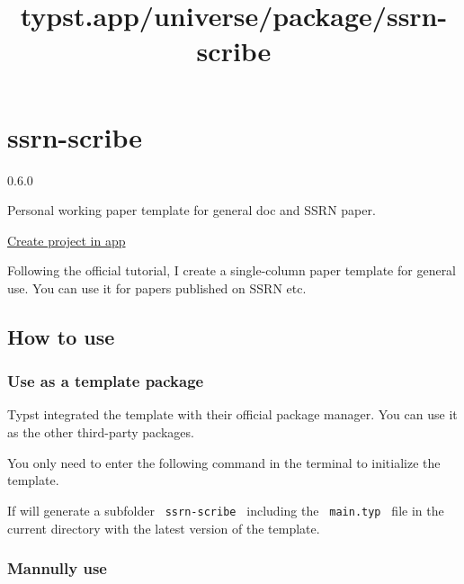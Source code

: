 \title{typst.app/universe/package/ssrn-scribe}

\label{banner}
\label{template-thumbnail}

\section{ssrn-scribe}\label{ssrn-scribe}

{ 0.6.0 }

Personal working paper template for general doc and SSRN paper.

\href{/app?template=ssrn-scribe&version=0.6.0}{Create project in app}

\label{readme}
Following the official tutorial, I create a single-column paper template
for general use. You can use it for papers published on SSRN etc.

\subsection{How to use}\label{how-to-use}

\subsubsection{Use as a template
package}\label{use-as-a-template-package}

Typst integrated the template with their official package manager. You
can use it as the other third-party packages.

You only need to enter the following command in the terminal to
initialize the template.

\begin{Shaded}
\begin{Highlighting}[]
\end{Highlighting}
\end{Shaded}

If will generate a subfolder \texttt{\ ssrn-scribe\ } including the
\texttt{\ main.typ\ } file in the current directory with the latest
version of the template.

\subsubsection{Mannully use}\label{mannully-use}

